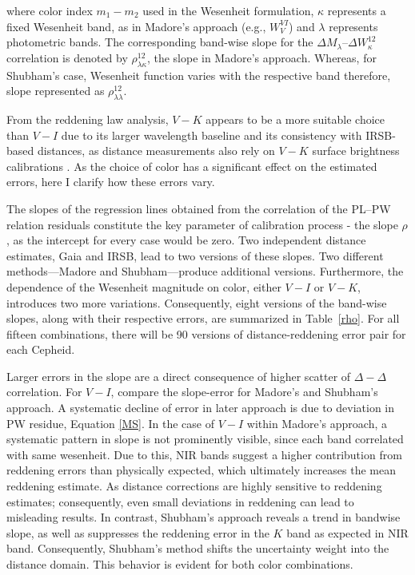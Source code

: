 where color index $m_1 - m_2$ used in the Wesenheit formulation, $\kappa$ represents a fixed Wesenheit band, as in Madore's approach (e.g., $W^{V\!I}_V$) and $\lambda$ represents photometric bands. The corresponding band-wise slope for the $\Delta M_\lambda$--$\Delta W^{12}_\kappa$ correlation is denoted by $\rho^{12}_{\lambda \kappa}$, the slope in Madore's approach. Whereas, for Shubham's case, Wesenheit function varies with the respective band therefore, slope represented as $\rho^{12}_{\lambda \lambda}$.

From the reddening law analysis, $V\!-\!K$ appears to be a more suitable choice than $V\!-\!I$ due to its larger wavelength baseline and its consistency with IRSB-based distances, as distance measurements also rely on $V\!-\!K$ surface brightness calibrations \citep{2011storm}. As the choice of color has a significant effect on the estimated errors, here I clarify how these errors vary. 


The slopes of the regression lines obtained from the correlation of the PL–PW relation residuals constitute the key parameter of calibration process - the slope $\rho$, as the intercept for every case would be zero. Two independent distance estimates, Gaia and IRSB, lead to two versions of these slopes. Two different methods—Madore and Shubham—produce additional versions. Furthermore, the dependence of the Wesenheit magnitude on color, either $V-I$ or $V-K$, introduces two more variations. Consequently, eight versions of the band-wise slopes, along with their respective errors, are summarized in Table~\ref{rho}. For all fifteen combinations, there will be 90 versions of distance-reddening error pair for each Cepheid. 

Larger errors in the slope are a direct consequence of higher scatter of $\Delta-\Delta$ correlation. For $V-I$, compare the slope-error for Madore's and Shubham's approach. A systematic decline of error in later approach is due to deviation in PW residue, Equation \ref{MS}. In the case of $V\!-\!I$ within Madore's approach, a systematic pattern in slope is not prominently visible, since each band correlated with same wesenheit. Due to this, NIR bands suggest a higher contribution from reddening errors than physically expected, which ultimately increases the mean reddening estimate. As distance corrections are highly sensitive to reddening estimates; consequently, even small deviations in reddening can lead to misleading results. In contrast, Shubham's approach reveals a trend in bandwise slope, as well as suppresses the reddening error in the $K$ band as expected in NIR band. Consequently, Shubham's method shifts the uncertainty weight into the distance domain. This behavior is evident for both color combinations. 

